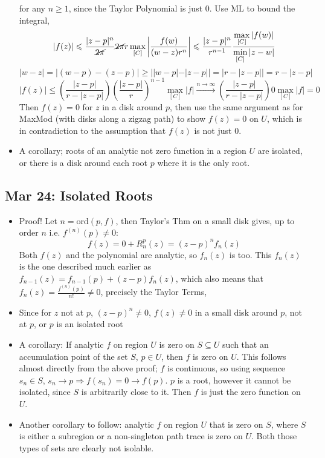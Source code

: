 \documentclass[10pt, oneside]{article}
\let\leq\leqslant
\let\geq\geqslant
\begin{document}
\begin{itemize}
        for any $n \geq 1$, since the Taylor Polynomial is just $0$. Use ML to bound the integral,
            \[|f(z)| \leq \frac{|z-p|^n}{\cancel{2\pi}} \cancel{2 \pi} r \max_{[C]} \left| \frac{f(w)}{(w-z)r^n} \right| \leq \frac{|z-p|^n}{r^{n-1}} \frac{\displaystyle \max_{[C]} |f(w)|}{\displaystyle \min_{[C]} |z-w|}\]
            \[|w-z| = |(w-p)-(z-p)| \geq ||w-p|-|z-p|| = |r - |z-p|| = r - |z-p|\]
            \[|f(z)| \leq \left( \frac{|z-p|}{r - |z-p|} \right) \left( \frac{|z-p|}{r} \right)^{n-1} \max_{[C]} |f| \overset{n \rightarrow \infty}{\rightarrow} \left( \frac{|z-p|}{r - |z-p|} \right) 0 \max_{[C]} |f| = 0\]
        Then $f(z) = 0$ for $z$ in a disk around $p$, then use the same argument as for MaxMod (with disks along a zigzag path) to show $f(z) = 0$ on $U$, which is in contradiction to the assumption that $f(z)$ is not just $0$.
    \item A corollary; roots of an analytic not zero function in a region $U$ are isolated, or there is a disk around each root $p$ where it is the only root.
\end{itemize}

\subsection{Mar 24: Isolated Roots}
\begin{itemize}
    \item Proof! Let $n = \text{ord}(p,f)$, then Taylor's Thm on a small disk gives, up to order $n$ i.e. $f^{(n)}(p) \neq 0$:
            \[f(z) = 0 + R^p_n(z) = (z-p)^n f_n(z)\]
        Both $f(z)$ and the polynomial are analytic, so $f_n(z)$ is too. This $f_n(z)$ is the one described much earlier as $f_{n-1}(z) = f_{n-1}(p) + (z-p)f_n(z)$, which also means that $f_n(z) = \frac{f^{(n)}(p)}{n!} \neq 0$, precisely the Taylor Terms,
    \item Since for $z$ not at $p$, $(z-p)^n \neq 0$, $f(z) \neq 0$ in a small disk around $p$, not at $p$, or $p$ is an isolated root
    \item A corollary: If analytic $f$ on region $U$ is zero on $S \subseteq U$ such that an accumulation point of the set $S$, $p \in U$, then $f$ is zero on $U$. This follows almost directly from the above proof; $f$ is continuous, so using sequence $s_n\in S$, $s_n \rightarrow p \Rightarrow f(s_n) = 0 \rightarrow f(p)$. $p$ is a root, however it cannot be isolated, since $S$ is arbitrarily close to it. Then $f$ is just the zero function on $U$.
    \item Another corollary to follow: analytic $f$ on region $U$ that is zero on $S$, where $S$ is either a subregion or a non-singleton path trace is zero on $U$. Both those types of sets are clearly not isolable. 
\end{itemize}
\end{document}

